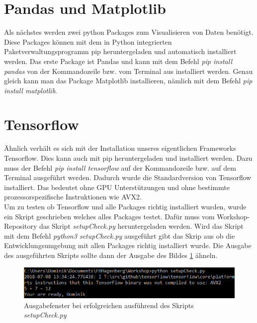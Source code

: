 \section{Pandas und Matplotlib}
Als nächstes werden zwei python Packages zum Visualisieren von Daten benötigt. Diese Packages können mit dem in Python integrierten Paketverwaltungsprogramm pip heruntergeladen und automatisch installiert werden. Das erste Package ist Pandas und kann mit dem Befehl \emph{pip install pandas} von der Kommandozeile bzw. vom Terminal aus installiert werden. Genau gleich kann man das Package Matplotlib installieren, nämlich mit dem Befehl \emph{pip install matplotlib}.\\
\section{Tensorflow}
Ähnlich verhält es sich mit der Installation unseres eigentlichen Frameworks Tensorflow. Dies kann auch mit pip heruntergeladen und installiert werden. Dazu muss der Befehl \emph{pip install tensorflow} auf der Kommandozeile bzw. auf dem Terminal ausgeführt werden. Dadurch wurde die Standardversion von Tensorflow installiert. Das bedeutet ohne GPU Unterstützungen und ohne bestimmte prozessorspezifische Instruktionen wie AVX2.\\
Um zu testen ob Tensorflow und alle Packages richtig installiert wurden, wurde ein Skript geschrieben welches alles Packages testet. Dafür muss vom Workshop-Repository das Skript \emph{setupCheck.py} heruntergeladen werden. Wird das Skript mit dem Befehl \emph{python3 setupCheck.py} ausgeführt gibt das Skrip aus ob die Entwicklungsumgebung mit allen Packages richtig installiert wurde. Die Ausgabe des ausgeführten Skripts sollte dann der Ausgabe des Bildes \ref{fig:setupCheck} ähneln.
\begin{figure}[!ht]
\centering
\includegraphics[width=1.00\textwidth]{images/setupCheck}
\caption{Ausgabefenster bei erfolgreichen ausführend des Skripts \emph{setupCheck.py}}
\label{fig:setupCheck}
\end{figure}
